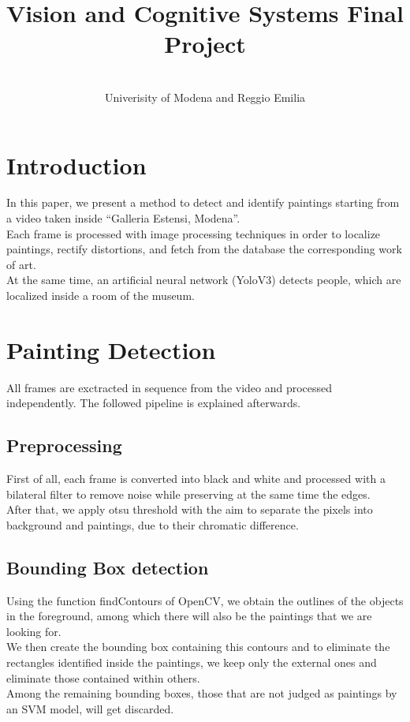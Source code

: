 \documentclass[conference]{IEEEtran}
\begin{document}
\title{Vision and Cognitive Systems Final Project}
\author{
\and
{}
\\
\large{Univerisity of Modena and Reggio Emilia}
\and
{}
}
\maketitle


\section{Introduction}
In this paper, we present a method to detect and identify paintings starting from a video taken inside “Galleria Estensi, Modena”.\\
Each frame is processed with image processing techniques in order to localize paintings, rectify distortions, and fetch from the database the corresponding work of art.\\
At the same time, an artificial neural network (YoloV3) detects people, which are localized inside a room of the museum.

\section{Painting Detection}
All frames are exctracted in sequence from the video and processed independently. The followed pipeline is explained afterwards.

\subsection{Preprocessing}
First of all, each frame is converted into black and white and processed with a bilateral filter to remove noise while preserving at the same time the edges.\\
After that, we apply otsu threshold  with the aim to separate the pixels into background and paintings, due to their chromatic difference.

\subsection{Bounding Box detection}
Using the function findContours of OpenCV, we obtain the outlines of the objects in the foreground, among which there will also be the paintings that we are looking for.\\
We then create the bounding box containing this contours and to eliminate the rectangles identified inside the paintings, we keep only the external ones and eliminate those contained within others.\\
Among the remaining bounding boxes, those that are not judged as paintings by an SVM model, will get discarded.
\end{document}
